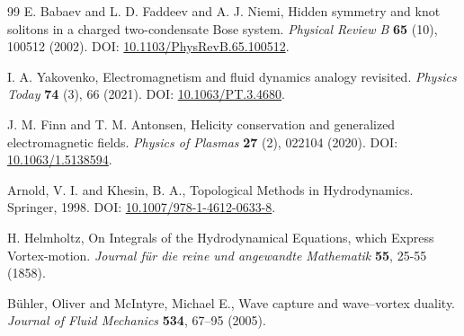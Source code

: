 \documentclass[preprint]{revtex4-2}
\begin{document}
\begin{thebibliography}{99}
E. Babaev and L. D. Faddeev and A. J. Niemi,
\newblock Hidden symmetry and knot solitons in a charged two-condensate Bose system.
\textit{Physical Review B} \textbf{65} (10), 100512 (2002).
\newblock DOI: \href{https://doi.org/10.1103/PhysRevB.65.100512}{10.1103/PhysRevB.65.100512}.


I. A. Yakovenko,
\newblock Electromagnetism and fluid dynamics analogy revisited.
\textit{Physics Today} \textbf{74} (3), 66 (2021).
\newblock DOI: \href{https://doi.org/10.1063/PT.3.4680}{10.1063/PT.3.4680}.


J. M. Finn and T. M. Antonsen,
\newblock Helicity conservation and generalized electromagnetic fields.
\textit{Physics of Plasmas} \textbf{27} (2), 022104 (2020).
\newblock DOI: \href{https://doi.org/10.1063/1.5138594}{10.1063/1.5138594}.


Arnold, V. I. and Khesin, B. A.,
\newblock Topological Methods in Hydrodynamics.
\newblock Springer, 1998.
\newblock DOI: \href{https://doi.org/10.1007/978-1-4612-0633-8}{10.1007/978-1-4612-0633-8}.


H. Helmholtz,
\newblock On Integrals of the Hydrodynamical Equations, which Express Vortex-motion.
\textit{Journal für die reine und angewandte Mathematik} \textbf{55}, 25-55 (1858).


B\"uhler, Oliver and McIntyre, Michael E.,
\newblock Wave capture and wave–vortex duality.
\textit{Journal of Fluid Mechanics} \textbf{534}, 67--95 (2005).


\end{thebibliography}
\end{document}
